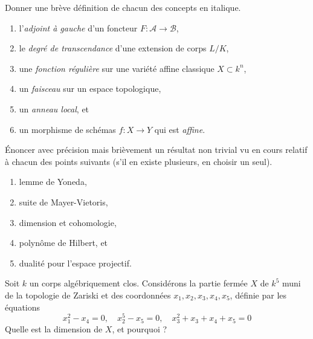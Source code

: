 \begin{exercise}[Définitions]
\label{exercise-definitions-fall-2017}
Donner une brève définition de chacun des concepts en italique.
\begin{enumerate}
\item l'{\it adjoint à gauche} d'un foncteur $F : \mathcal{A} \to \mathcal{B}$,
\item le {\it degré de transcendance} d'une extension de corps $L/K$,
\item une {\it fonction régulière} sur une variété affine classique
$X \subset k^n$,
\item un {\it faisceau} sur un espace topologique,
\item un {\it anneau local}, et
\item un morphisme de schémas $f : X \to Y$ qui est {\it affine}.
\end{enumerate}
\end{exercise}

\begin{exercise}[Théorèmes]
\label{exercise-results-fall-2017}
Énoncer avec précision mais brièvement un résultat non trivial vu en cours
relatif à chacun des points suivants (s'il en existe plusieurs, en choisir
un seul).
\begin{enumerate}
\item lemme de Yoneda,
\item suite de Mayer-Vietoris,
\item dimension et cohomologie,
\item polynôme de Hilbert, et
\item dualité pour l'espace projectif.
\end{enumerate}
\end{exercise}

\begin{exercise}
\label{exercise-compute-dimension}
Soit $k$ un corps algébriquement clos. Considérons la partie fermée
$X$ de $k^5$ muni de la topologie de Zariski et des coordonnées $x_1, x_2, x_3, x_4, x_5$,
définie par les équations
$$
x_1^2 - x_4 = 0,\quad
x_2^5 - x_5 = 0,\quad
x_3^2 + x_3 + x_4 + x_5 = 0
$$
Quelle est la dimension de $X$, et pourquoi ?
\end{exercise}

